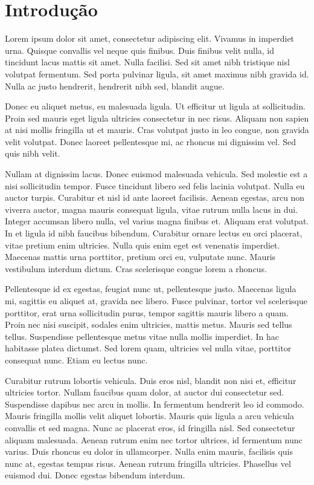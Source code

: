 \chapter{Introdução}

Lorem ipsum dolor sit amet, consectetur adipiscing elit. Vivamus in imperdiet urna. Quisque convallis vel neque quis finibus. Duis finibus velit nulla, id tincidunt lacus mattis sit amet. Nulla facilisi. Sed sit amet nibh tristique nisl volutpat fermentum. Sed porta pulvinar ligula, sit amet maximus nibh gravida id. Nulla ac justo hendrerit, hendrerit nibh sed, blandit augue.

Donec eu aliquet metus, eu malesuada ligula. Ut efficitur ut ligula at sollicitudin. Proin sed mauris eget ligula ultricies consectetur in nec risus. Aliquam non sapien at nisi mollis fringilla ut et mauris. Cras volutpat justo in leo congue, non gravida velit volutpat. Donec laoreet pellentesque mi, ac rhoncus mi dignissim vel. Sed quis nibh velit.

Nullam at dignissim lacus. Donec euismod malesuada vehicula. Sed molestie est a nisi sollicitudin tempor. Fusce tincidunt libero sed felis lacinia volutpat. Nulla eu auctor turpis. Curabitur et nisl id ante laoreet facilisis. Aenean egestas, arcu non viverra auctor, magna mauris consequat ligula, vitae rutrum nulla lacus in dui. Integer accumsan libero nulla, vel varius magna finibus et. Aliquam erat volutpat. In et ligula id nibh faucibus bibendum. Curabitur ornare lectus eu orci placerat, vitae pretium enim ultricies. Nulla quis enim eget est venenatis imperdiet. Maecenas mattis urna porttitor, pretium orci eu, vulputate nunc. Mauris vestibulum interdum dictum. Cras scelerisque congue lorem a rhoncus.

Pellentesque id ex egestas, feugiat nunc ut, pellentesque justo. Maecenas ligula mi, sagittis eu aliquet at, gravida nec libero. Fusce pulvinar, tortor vel scelerisque porttitor, erat urna sollicitudin purus, tempor sagittis mauris libero a quam. Proin nec nisi suscipit, sodales enim ultricies, mattis metus. Mauris sed tellus tellus. Suspendisse pellentesque metus vitae nulla mollis imperdiet. In hac habitasse platea dictumst. Sed lorem quam, ultricies vel nulla vitae, porttitor consequat nunc. Etiam eu lectus nunc.

Curabitur rutrum lobortis vehicula. Duis eros nisl, blandit non nisi et, efficitur ultricies tortor. Nullam faucibus quam dolor, at auctor dui consectetur sed. Suspendisse dapibus nec arcu in mollis. In fermentum hendrerit leo id commodo. Mauris fringilla mollis velit aliquet lobortis. Mauris quis ligula a arcu vehicula convallis et sed magna. Nunc ac placerat eros, id fringilla nisl. Sed consectetur aliquam malesuada. Aenean rutrum enim nec tortor ultrices, id fermentum nunc varius. Duis rhoncus eu dolor in ullamcorper. Nulla enim mauris, facilisis quis nunc at, egestas tempus risus. Aenean rutrum fringilla ultricies. Phasellus vel euismod dui. Donec egestas bibendum interdum.


